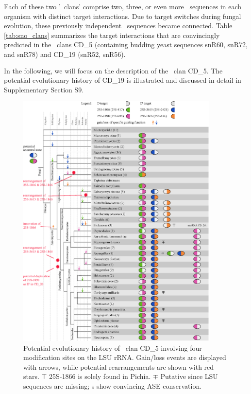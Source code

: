 Each of these two '\sno\ clans' comprise two, three, or even more \sno\
sequences in each organism with distinct target interactions. Due to target
switches during fungal evolution, these previously independent \sno\
sequences became connected. Table \ref{tab:sno_clans} summarizes the target
interactions that are convincingly predicted in the \sno\ clans CD\_5
(containing budding yeast sequences snR60, snR72, and snR78) and CD\_19
(snR52, snR56).

In the following, we will focus on the description of the \sno\ clan
CD\_5. The potential evolutionary history of CD\_19 is illustrated and
discussed in detail in Supplementary Section S9.

\begin{figure}
  \centering
  \includegraphics[width=0.9\textwidth]{pics/target_switches_CD_5.eps}
  \caption[Potential evolutionary history of \sno\ clan CD\_5.]{Potential
    evolutionary history of \sno\ clan CD\_5 involving four modification
    sites on the LSU rRNA. Gain/loss events are displayed with arrows,
    while potential rearrangements are shown with red stars. $\top$
    25S-1866 is solely found in Pichia. $\mp$ Putative since LSU sequences
    are missing; \sno s show convincing ASE conservation.}
  \label{fig:CD_5}
\end{figure}

